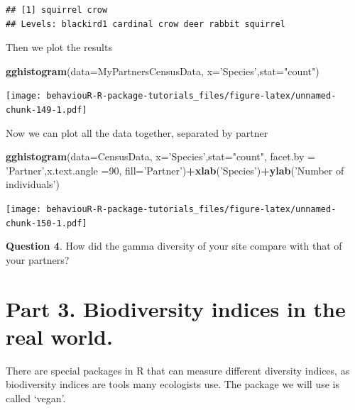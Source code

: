 \documentclass[]{book}
\newenvironment{Shaded}{\begin{snugshade}}{\end{snugshade}}
\newcommand{\DataTypeTok}[1]{\textcolor[rgb]{0.13,0.29,0.53}{#1}}
\newcommand{\DecValTok}[1]{\textcolor[rgb]{0.00,0.00,0.81}{#1}}
\newcommand{\KeywordTok}[1]{\textcolor[rgb]{0.13,0.29,0.53}{\textbf{#1}}}
\newcommand{\NormalTok}[1]{#1}
\newcommand{\OperatorTok}[1]{\textcolor[rgb]{0.81,0.36,0.00}{\textbf{#1}}}
\newcommand{\StringTok}[1]{\textcolor[rgb]{0.31,0.60,0.02}{#1}}
\begin{document}
\begin{verbatim}
## [1] squirrel crow    
## Levels: blackird1 cardinal crow deer rabbit squirrel
\end{verbatim}

Then we plot the results

\begin{Shaded}
\begin{Highlighting}[]
\KeywordTok{gghistogram}\NormalTok{(}\DataTypeTok{data=}\NormalTok{MyPartnersCensusData, }\DataTypeTok{x=}\StringTok{'Species'}\NormalTok{,}\DataTypeTok{stat=}\StringTok{"count"}\NormalTok{)}
\end{Highlighting}
\end{Shaded}

\texttt{[image: behaviouR-R-package-tutorials\_files/figure-latex/unnamed-chunk-149-1.pdf]}

Now we can plot all the data together, separated by partner

\begin{Shaded}
\begin{Highlighting}[]
\KeywordTok{gghistogram}\NormalTok{(}\DataTypeTok{data=}\NormalTok{CensusData, }\DataTypeTok{x=}\StringTok{'Species'}\NormalTok{,}\DataTypeTok{stat=}\StringTok{"count"}\NormalTok{,}
            \DataTypeTok{facet.by =} \StringTok{'Partner'}\NormalTok{,}\DataTypeTok{x.text.angle =}\DecValTok{90}\NormalTok{,}
            \DataTypeTok{fill=}\StringTok{'Partner'}\NormalTok{)}\OperatorTok{+}\KeywordTok{xlab}\NormalTok{(}\StringTok{'Species'}\NormalTok{)}\OperatorTok{+}\KeywordTok{ylab}\NormalTok{(}\StringTok{'Number of individuals'}\NormalTok{)}
\end{Highlighting}
\end{Shaded}

\texttt{[image: behaviouR-R-package-tutorials\_files/figure-latex/unnamed-chunk-150-1.pdf]}

\textbf{Question 4}. How did the gamma diversity of your site compare with that of your partners?

\hypertarget{part-3.-biodiversity-indices-in-the-real-world.}{%
\section{Part 3. Biodiversity indices in the real world.}\label{part-3.-biodiversity-indices-in-the-real-world.}}

There are special packages in R that can measure different diversity indices, as biodiversity indices are tools many ecologists use. The package we will use is called `vegan'.
\end{document}

